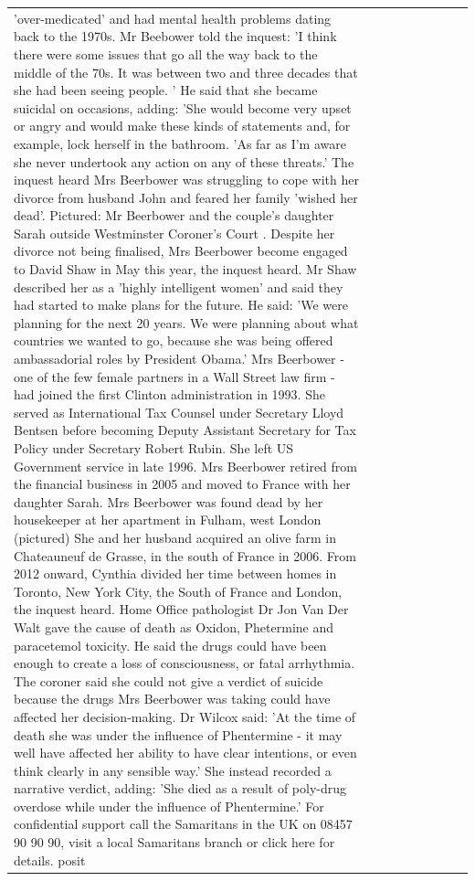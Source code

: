 \begin{table}[H]
\begin{tabular}{lllrlllll}
'over-medicated' and had mental health problems dating back to the 1970s. Mr Beebower told the inquest: 'I think there were some issues that go all the way back to the middle of the 70s. It was between two and three decades that she had been seeing people. ' He said that she became suicidal on occasions, adding: 'She would become very upset or angry and would make these kinds of statements and, for example, lock herself in the bathroom. 'As far as I'm aware she never undertook any action on any of these threats.' The inquest heard Mrs Beerbower was struggling to cope with her divorce from husband John and feared her family 'wished her dead'. Pictured: Mr Beerbower and the couple's daughter Sarah outside Westminster Coroner's Court . Despite her divorce not being finalised, Mrs Beerbower become engaged to David Shaw in May this year, the inquest heard. Mr Shaw described her as a 'highly intelligent women' and said they had started to make plans for the future. He said: 'We were planning for the next 20 years. We were planning about what countries we wanted to go, because she was being offered ambassadorial roles by President Obama.' Mrs Beerbower - one of the few female partners in a Wall Street law firm - had joined the first Clinton administration in 1993. She served as International Tax Counsel under Secretary Lloyd Bentsen before becoming Deputy Assistant Secretary for Tax Policy under Secretary Robert Rubin. She left US Government service in late 1996. Mrs Beerbower retired from the financial business in 2005 and moved to France with her daughter Sarah. Mrs Beerbower was found dead by her housekeeper at her apartment in Fulham, west London (pictured) She and her husband acquired an olive farm in Chateauneuf de Grasse, in the south of France in 2006. From 2012 onward, Cynthia divided her time between homes in Toronto, New York City, the South of France and London, the inquest heard. Home Office pathologist Dr Jon Van Der Walt gave the cause of death as Oxidon, Phetermine and paracetemol toxicity. He said the drugs could have been enough to create a loss of consciousness, or fatal arrhythmia. The coroner said she could not give a verdict of suicide because the drugs Mrs Beerbower was taking could have affected her decision-making. Dr Wilcox said: 'At the time of death she was under the influence of Phentermine - it may well have affected her ability to have clear intentions, or even think clearly in any sensible way.' She instead recorded a narrative verdict, adding: 'She died as a result of poly-drug overdose while under the influence of Phentermine.' For confidential support call the Samaritans in the UK on 08457 90 90 90, visit a local Samaritans branch or click here for details. posit \\

\end{tabular}
\end{table}
